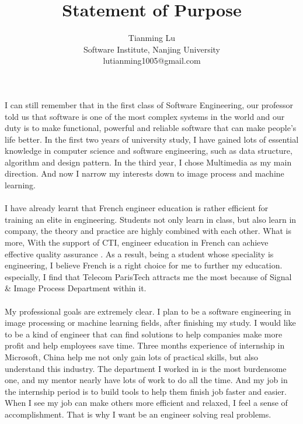 \documentclass[a4paper]{article}
\title{Statement of Purpose}
\author{Tianming Lu \\
		Software Institute, Nanjing University\\
		lutianming1005@gmail.com}
\date{}
\begin{document}
\maketitle
\paragraph{}
I can still remember that in the first class of Software Engineering, our professor told us that software is one of the most complex systems in the world and our duty is to make functional, powerful and reliable software that can make people's life better. In the first two years of university study, I have gained lots of essential knowledge in computer science and software engineering, such as data structure, algorithm and design pattern. In the third year, I chose Multimedia as my main direction. And now I narrow my interests down to image process and machine learning.
\paragraph{}
I have already learnt that French engineer education is rather efficient for training an elite in engineering. Students not only learn in class, but also learn in company, the theory and practice are highly combined with each other. What is more, With the support of CTI, engineer education in French can achieve effective quality assurance . As a result, being a student whose speciality is engineering, I believe French is a right choice for me to further my education. especially, I find that Telecom ParisTech attracts me the most because of Signal \& Image Process Department within it. 
\paragraph{}
My professional goals are extremely clear. I plan to be a software engineering in image processing or machine learning fields, after finishing my study. I would like to be a kind of engineer that can find solutions to help companies make more profit and help employees save time. Three months experience of internship in Microsoft, China help me not only gain lots of practical skills, but also understand this industry. The department I worked in is the most burdensome one, and my mentor nearly have lots of work to do all the time. And my job in the internship period is to build tools to help them finish job faster and easier. When I see my job can make others more efficient and relaxed, I feel a sense of accomplishment. That is why I want be an engineer solving real problems.
\end{document}
